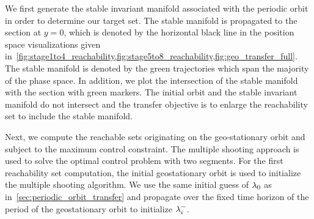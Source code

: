 We first generate the stable invariant manifold associated with the periodic orbit in order to determine our target set.
The stable manifold is propagated to the \Poincare section at \( y = 0 \), which is denoted by the horizontal black line in the position space visualizations given in~\cref{fig:stage1to4_reachability,fig:stage5to8_reachability,fig:geo_transfer_full}.
The stable manifold is denoted by the green trajectories which span the majority of the phase space. 
In addition, we plot the intersection of the stable manifold with the \Poincare section with green markers.
The initial orbit and the stable invariant manifold do not intersect and the transfer objective is to enlarge the reachability set to include the stable manifold.

Next, we compute the reachable sets originating on the geo-stationary orbit and subject to the maximum control constraint. 
The multiple shooting approach is used to solve the optimal control problem with two segments.
For the first reachability set computation, the initial geostationary orbit is used to initialize the multiple shooting algorithm.
We use the same initial guess of \( \lambda_0\) as in~\cref{sec:periodic_orbit_transfer} and propagate over the fixed time horizon of the period of the geostationary orbit to initialize \( \lambda_i^{-}\).

